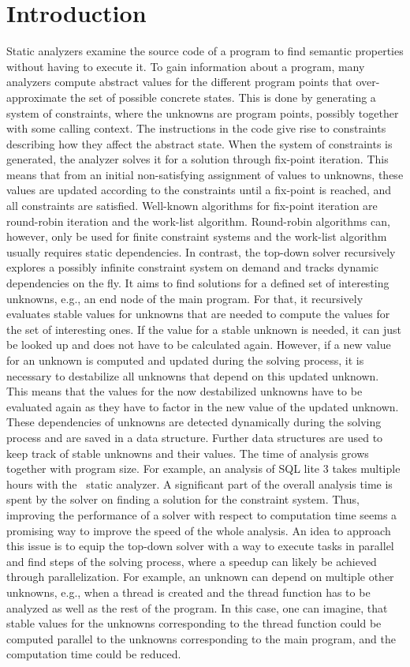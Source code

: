 \section{Introduction}
\label{sec:introduction}
Static analyzers examine the source code of a program to find semantic properties without having to execute it. To gain information about a program, many analyzers compute abstract values for the different program points that over-approximate the set of possible concrete states. This is done by generating a system of constraints, where the unknowns are program points, possibly together with some calling context. The instructions in the code give rise to constraints describing how they affect the abstract state. When the system of constraints is generated, the analyzer solves it for a solution through fix-point iteration. This means that from an initial non-satisfying assignment of values to unknowns, these values are updated according to the constraints until a fix-point is reached, and all constraints are satisfied. Well-known algorithms for fix-point iteration are round-robin iteration and the work-list algorithm. Round-robin algorithms can, however, only be used for finite constraint systems and the work-list algorithm usually requires static dependencies. In contrast, the top-down solver recursively explores a possibly infinite constraint system on demand and tracks dynamic dependencies on the fly. It aims to find solutions for a defined set of interesting unknowns, e.g., an end node of the main program. For that, it recursively evaluates stable values for unknowns that are needed to compute the values for the set of interesting ones. If the value for a stable unknown is needed, it can just be looked up and does not have to be calculated again. However, if a new value for an unknown is computed and updated during the solving process, it is necessary to destabilize all unknowns that depend on this updated unknown. This means that the values for the now destabilized unknowns have to be evaluated again as they have to factor in the new value of the updated unknown. These dependencies of unknowns are detected dynamically during the solving process and are saved in a data structure. Further data structures are used to keep track of stable unknowns and their values. 
The time of analysis grows together with program size. For example, an analysis of SQL lite 3 takes multiple hours with the \gob\ static analyzer. A significant part of the overall analysis time is spent by the solver on finding a solution for the constraint system. Thus, improving the performance of a solver with respect to computation time seems a promising way to improve the speed of the whole analysis. An idea to approach this issue is to equip the top-down solver with a way to execute tasks in parallel and find steps of the solving process, where a speedup can likely be achieved through parallelization. For example, an unknown can depend on multiple other unknowns, e.g., when a thread is created and the thread function has to be analyzed as well as the rest of the program. In this case, one can imagine, that stable values for the unknowns corresponding to the thread function could be computed parallel to the unknowns corresponding to the main program, and the computation time could be reduced.
